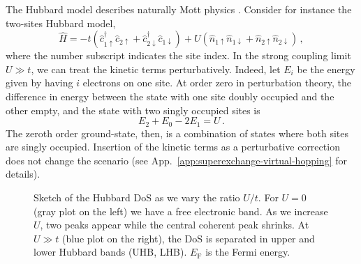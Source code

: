 The Hubbard model describes naturally Mott physics \cite{scalapino2012common}. Consider for instance the two-sites Hubbard model,
\begin{equation}\label{eq:hubbard-2-sites}
	\hat H = 
	-t \left(
		\hat c_{1\uparrow}^\dagger \hat c_{2\uparrow} + \hat c_{2\downarrow}^\dagger \hat c_{1\downarrow}
	\right)
	+ U \left(
		\hat n_{1\uparrow} \hat n_{1\downarrow} + \hat n_{2\uparrow} \hat n_{2\downarrow} 
	\right) \, ,
\end{equation}
where the number subscript indicates the site index. In the strong coupling limit $U \gg t$, we can treat the kinetic terms perturbatively. Indeed, let $E_i$ be the energy given by having $i$ electrons on one site. At order zero in perturbation theory, the difference in energy between the state with one site doubly occupied and the other empty, and the state with two singly occupied sites is
\begin{equation}\label{eq:E2+E0-2E1=U}
	E_2 + E_0 - 2E_1 = U \, . 
\end{equation}
The zeroth order ground-state, then, is a combination of states where both sites are singly occupied. Insertion of the kinetic terms as a perturbative correction does not change the scenario (see App.~\ref{app:superexchange-virtual-hopping} for details).

\begin{figure}
	\centering
	
	\caption{Sketch of the Hubbard DoS as we vary the ratio $U/t$. For $U=0$ (gray plot on the left) we have a free electronic band. As we increase $U$, two peaks appear while the central coherent peak shrinks. At $U \gg t$ (blue plot on the right), the DoS is separated in upper and lower Hubbard bands (UHB, LHB). $E_\mathrm{F}$ is the Fermi energy.}
	\label{fig:hubbard-bands}
\end{figure}

